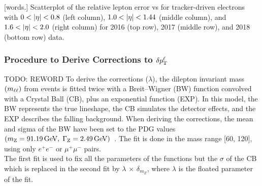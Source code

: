 \begin{multiFigure}
    \centering


        [words.]
        {Scatterplot of the relative lepton \PT error vs \PT for tracker-driven electrons with $0 < \lvert \eta \rvert < 0.8$ (left column), $1.0 < \lvert \eta \rvert < 1.44$ (middle column), and $1.6 < \lvert \eta \rvert < 2.0$ (right column) for 2016 (top row), 2017 (middle row), and 2018 (bottom row) data.}
    \label{fig:2D_Mpas_vs_pt_electron_tracker}
\end{multiFigure}

\subsubsection{Procedure to Derive Corrections to $\delta p_{\mathrm{T}}^{\ell}$}
TODO: REWORD
To derive the corrections ($\lambda$), the dilepton invariant mass $\left( m_{\ell\ell} \right)$ from \ztolplm events is fitted twice with a Breit--Wigner (BW) function convolved with a Crystal Ball (CB), plus an exponential function (EXP).
In this model, the BW represents the true \mZ lineshape, the CB simulates the detector effects, and the EXP describes the falling background.
When deriving the corrections, the mean and sigma of the BW have been set to the PDG values $\left( m_{\mathrm{Z}} = 91.19\,\text{Ge\hspace{-.08em}V}, \; \Gamma_{\mathrm{Z}} = 2.49\,\text{Ge\hspace{-.08em}V} \right)$~\cite{particle_data_group_review_2020}.
 The fit is done in the mass range [60, 120]\GeV, using only
$e^{+}e^{-}$ or $\mu^{+}\mu^{-}$ pairs.\\
The first fit is used to fix all the parameters of the functions but the $\sigma$ of the CB which is
replaced in the second fit by $\lambda$ $\times$ $\delta_{m_{Z}}$, where $\lambda$ is the 
floated parameter of the fit. 



